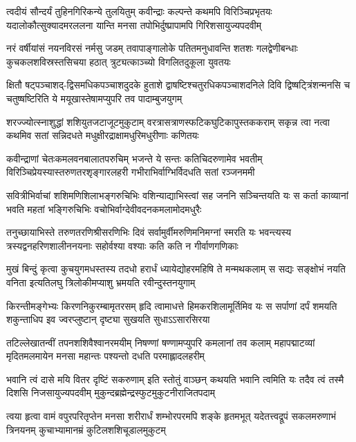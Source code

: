 \fourlineindentedshloka
{त्वदीयं सौन्दर्यं तुहिनगिरिकन्ये तुलयितुम्}
{कवीन्द्राः कल्पन्ते कथमपि विरिञ्चिप्रभृतयः}
{यदालोकौत्सुक्यादमरललना यान्ति मनसा}
{तपोभिर्दुष्प्रापामपि गिरिशसायुज्यपदवीम्}%

\fourlineindentedshloka
{नरं वर्षीयांसं नयनविरसं नर्मसु जडम्}
{तवापाङ्गालोके पतितमनुधावन्ति शतशः}
{गलद्वेणीबन्धाः कुचकलशविस्रस्तसिचया}
{हठात् त्रुट्यत्काञ्च्यो विगलितदुकूला युवतयः}%

\fourlineindentedshloka
{क्षितौ षट्पञ्चाशद्-द्विसमधिकपञ्चाशदुदके}
{हुताशे द्वाषष्टिश्चतुरधिकपञ्चाशदनिले}
{दिवि द्विष्षट्त्रिंशन्मनसि च चतुष्षष्टिरिति ये}
{मयूखास्तेषामप्युपरि तव पादाम्बुजयुगम्}%

\fourlineindentedshloka
{शरज्ज्योत्स्नाशुद्धां शशियुतजटाजूटमुकुटाम्}
{वरत्रासत्राणस्फटिकघुटिकापुस्तककराम्}
{सकृन्न त्वा नत्वा कथमिव सतां सन्निदधते}
{मधुक्षीरद्राक्षामधुरिमधुरीणाः कणितयः}%

\fourlineindentedshloka
{कवीन्द्राणां चेतःकमलवनबालातपरुचिम्}
{भजन्ते ये सन्तः कतिचिदरुणामेव भवतीम्}
{विरिञ्चिप्रेयस्यास्तरुणतरशृङ्गारलहरी}
{गभीराभिर्वाग्भिर्विदधति सतां रञ्जनममी}%

\fourlineindentedshloka
{सवित्रीभिर्वाचां शशिमणिशिलाभङ्गरुचिभिः}
{वशिन्याद्याभिस्त्वां सह जननि सञ्चिन्तयति यः}
{स कर्ता काव्यानां भवति महतां भङ्गिरुचिभिः}
{वचोभिर्वाग्देवीवदनकमलामोदमधुरैः}%

\fourlineindentedshloka
{तनुच्छायाभिस्ते तरुणतरणिश्रीसरणिभिः}
{दिवं सर्वामुर्वीमरुणिमनिमग्नां स्मरति यः}
{भवन्त्यस्य त्रस्यद्वनहरिणशालीननयनाः}
{सहोर्वश्या वश्याः कति कति न गीर्वाणगणिकाः}%

\fourlineindentedshloka
{मुखं बिन्दुं कृत्वा कुचयुगमधस्तस्य तदधो}
{हरार्धं ध्यायेद्योहरमहिषि ते मन्मथकलाम्}
{स सद्यः सङ्क्षोभं नयति वनिता इत्यतिलघु}
{त्रिलोकीमप्याशु भ्रमयति रवीन्दुस्तनयुगाम्}%

\fourlineindentedshloka
{किरन्तीमङ्गेभ्यः किरणनिकुरम्बामृतरसम्}
{हृदि त्वामाधत्ते हिमकरशिलामूर्तिमिव यः}
{स सर्पाणां दर्पं शमयति शकुन्ताधिप इव}
{ज्वरप्लुष्टान् दृष्ट्या सुखयति सुधाऽऽसारसिरया}%

\fourlineindentedshloka
{तटिल्लेखातन्वीं तपनशशिवैश्वानरमयीम्}
{निषण्णां षण्णामप्युपरि कमलानां तव कलाम्}
{महापद्माटव्यां मृदितमलमायेन मनसा}
{महान्तः पश्यन्तो दधति परमाह्लादलहरीम्}%

\fourlineindentedshloka
{भवानि त्वं दासे मयि वितर दृष्टिं सकरुणाम्}
{इति स्तोतुं वाञ्छन् कथयति भवानि त्वमिति यः}
{तदैव त्वं तस्मै दिशसि निजसायुज्यपदवीम्}
{मुकुन्दब्रह्मेन्द्रस्फुटमुकुटनीराजितपदाम्}%

\fourlineindentedshloka
{त्वया हृत्वा वामं वपुरपरितृप्तेन मनसा}
{शरीरार्धं शम्भोरपरमपि शङ्के हृतमभूत्}
{यदेतत्त्वद्रूपं सकलमरुणाभं त्रिनयनम्}
{कुचाभ्यामानम्रं कुटिलशशिचूडालमुकुटम्}%

